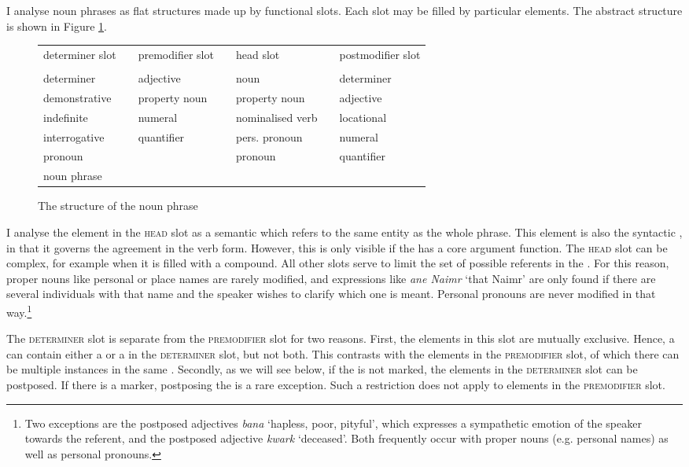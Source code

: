 I analyse noun phrases as flat structures made up by functional slots. Each slot may be filled by particular elements. The abstract structure is shown in Figure \ref{nounphrasestruc}.

\begin{figure}
	\caption{The structure of the noun phrase}
	\label{nounphrasestruc}
	\begin{tabularx}{\textwidth}{Xp{}Xp{}Xp{}X}
		\cline{1-1}\cline{3-3}\cline{5-5}\cline{7-7} 
		\multicolumn{1}{|l|}{determiner slot}&&\multicolumn{1}{|l|}{premodifier slot}&&\multicolumn{1}{|l|}{head slot}&&\multicolumn{1}{|l|}{postmodifier slot}\\
		\cline{1-1}\cline{3-3}\cline{5-5}\cline{7-7}
		&&&&&&\\
		determiner&&adjective&&noun&&determiner\\
		demonstrative&&property noun&&property noun&&adjective\\
		indefinite&&numeral&&nominalised verb&&locational\\
		interrogative&&quantifier&&pers. pronoun&&numeral\\
		{\Poss} pronoun&&&&{\Recog} pronoun&&quantifier\\
		noun phrase&&&&&&\\
	\end{tabularx}
\end{figure}

I analyse the element in the \textsc{head} slot as a semantic  which refers to the same entity as the whole phrase. This element is also the syntactic , in that it governs the agreement in the verb form. However, this is only visible if the  has a core argument function. The \textsc{head} slot can be complex, for example when it is filled with a compound. All other slots serve to limit the set of possible referents in the . For this reason, proper nouns like personal or place names are rarely modified, and expressions like \emph{ane Naimr} `that Naimr' are only found if there are several individuals with that name and the speaker wishes to clarify which one is meant. Personal pronouns are never modified in that way.\footnote{Two exceptions are the postposed adjectives \emph{bana} `hapless, poor, pityful', which expresses a sympathetic emotion of the speaker towards the referent, and the postposed adjective \emph{kwark} `deceased'. Both frequently occur with proper nouns (e.g. personal names) as well as personal pronouns.}

The \textsc{determiner} slot is separate from the \textsc{premodifier} slot for two reasons. First, the elements in this slot are mutually exclusive. Hence, a  can contain either a  or a  in the \textsc{determiner} slot, but not both. This contrasts with the elements in the \textsc{premodifier} slot, of which there can be multiple instances in the same . Secondly, as we will see below, if the  is not  marked, the elements in the \textsc{determiner} slot can be postposed. If there is a  marker, postposing the  is a rare exception. Such a restriction does not apply to elements in the \textsc{premodifier} slot.

